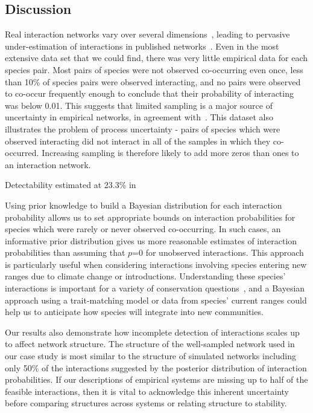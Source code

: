 \documentclass[12pt]{article}
\begin{document}
\begin{spacing}{2.0}

\section*{Discussion}

  Real interaction networks vary over several dimensions~\citep{Kitching1987,Olesen2011a,Pires2011a,Baiser2012,Fodrie2015,Novak2015}, leading to pervasive under-estimation of interactions in published networks~\citep{Jordano2016}. Even in the most extensive data set that we could find, there was very little empirical data for each species pair. Most pairs of species were not observed co-occurring even once, less than 10\% of species pairs were observed interacting, and no pairs were observed to co-occur frequently enough to conclude that their probability of interacting was below 0.01. This suggests that limited sampling is a major source of uncertainty in empirical networks, in agreement with~\citet{Jordano2016,Weinstein2017a,Weinstein2017}. This dataset also illustrates the problem of process uncertainty - pairs of species which were observed interacting did not interact in all of the samples in which they co-occurred. Increasing sampling is therefore likely to add more zeros than ones to an interaction network.


  Detectability estimated at 23.3\% in~\citet{Weinstein2017a}


  Using prior knowledge to build a Bayesian distribution for each interaction probability allows us to set appropriate bounds on interaction probabilities for species which were rarely or never observed co-occurring. In such cases, an informative prior distribution gives us more reasonable estimates of interaction probabilities than assuming that $p$=0 for unobserved interactions. This approach is particularly useful when considering interactions involving species entering new ranges due to climate change or introductions. Understanding these species' interactions is important for a variety of conservation questions~\citep{Bartomeus2013,Gravel2013}, and a Bayesian approach using a trait-matching model or data from species' current ranges could help us to anticipate how species will integrate into new communities. 


  Our results also demonstrate how incomplete detection of interactions scales up to affect network structure. The structure of the well-sampled network used in our case study is most similar to the structure of simulated networks including only 50\% of the interactions suggested by the posterior distribution of interaction probabilities. If our descriptions of empirical systems are missing up to half of the feasible interactions, then it is vital to acknowledge this inherent uncertainty before comparing structures across systems or relating structure to stability.



\end{spacing}
\end{document}
